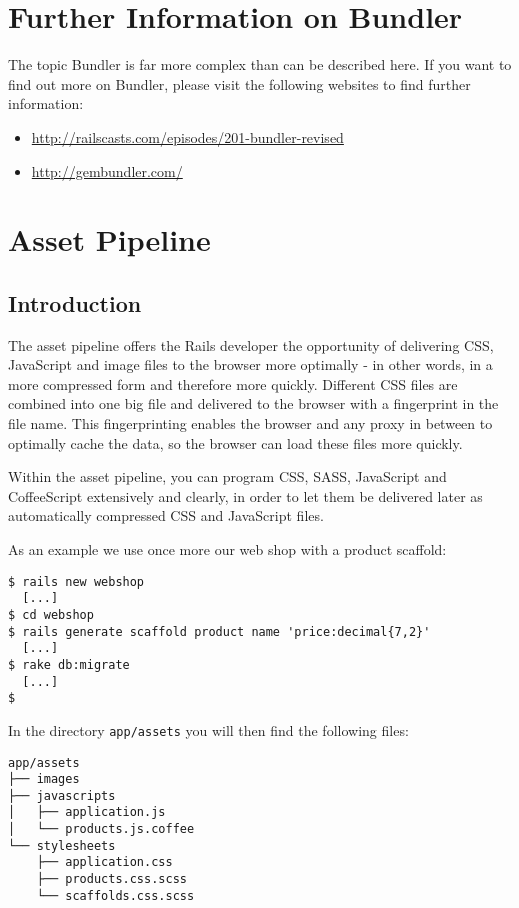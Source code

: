 \documentclass[a4paper]{book}
\newcommand{\chap}[1]{\newpage\thispagestyle{empty}\chapter{#1}\label{chap:\thechapter}}
\begin{document}
\chap{Further Information on Bundler}\label{further-information-on-bundler}

The topic Bundler is far more complex than can be described here. If you want to find out more on Bundler, please visit the following websites to find further information:

\begin{itemize}
\itemsep1pt\parskip0pt
\item
  \url{http://railscasts.com/episodes/201-bundler-revised}
\item
  \url{http://gembundler.com/}
\end{itemize}

\chap{Asset Pipeline}\label{asset-pipeline}

\section{Introduction}\label{introduction-5}

The asset pipeline offers the Rails developer the opportunity of delivering CSS, JavaScript and image files to the browser more optimally - in other words, in a more compressed form and therefore more quickly. Different CSS files are combined into one big file and delivered to the browser with a fingerprint in the file name. This fingerprinting enables the browser and any proxy in between to optimally cache the data, so the browser can load these files more quickly.

Within the asset pipeline, you can program CSS, SASS, JavaScript and CoffeeScript extensively and clearly, in order to let them be delivered later as automatically compressed CSS and JavaScript files.

As an example we use once more our web shop with a product scaffold:

\begin{shaded}\begin{verbatim}
$ rails new webshop
  [...]
$ cd webshop
$ rails generate scaffold product name 'price:decimal{7,2}'
  [...]
$ rake db:migrate
  [...]
$
\end{verbatim}\end{shaded}

In the directory \texttt{app/assets} you will then find the following files:

\begin{shaded}\begin{verbatim}
app/assets
├── images
├── javascripts
│   ├── application.js
│   └── products.js.coffee
└── stylesheets
    ├── application.css
    ├── products.css.scss
    └── scaffolds.css.scss
\end{verbatim}\end{shaded}
\end{document}
